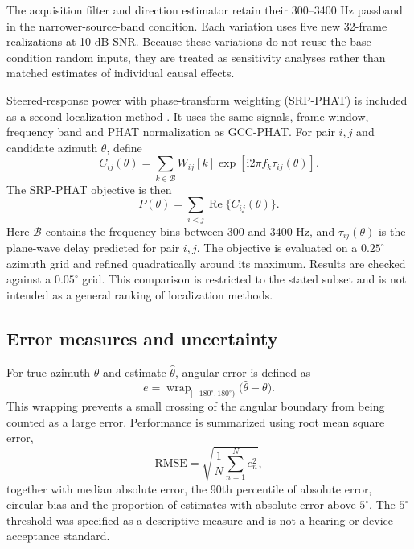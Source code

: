 \documentclass{edpsci}
\begin{document}
The acquisition filter and direction estimator retain their 300--3400 Hz passband in the narrower-source-band condition. Each variation uses five new 32-frame realizations at 10 dB SNR. Because these variations do not reuse the base-condition random inputs, they are treated as sensitivity analyses rather than matched estimates of individual causal effects.

Steered-response power with phase-transform weighting (SRP-PHAT) is included as a second localization method \citep{dibiase}. It uses the same signals, frame window, frequency band and PHAT normalization as GCC-PHAT. For pair $i,j$ and candidate azimuth $\theta$, define
\begin{equation}
	C_{ij}(\theta)
	=
	\sum_{k\in\mathcal{B}} W_{ij}[k]
	\exp\!\left[
	\mathrm{i}2\pi f_k\tau_{ij}(\theta)
	\right].
\end{equation}
The SRP-PHAT objective is then
\begin{equation}
	P(\theta)
	=
	\sum_{i<j}\operatorname{Re}
	\bigl\{C_{ij}(\theta)\bigr\}.
\end{equation}
Here $\mathcal{B}$ contains the frequency bins between 300 and 3400 Hz, and $\tau_{ij}(\theta)$ is the plane-wave delay predicted for pair $i,j$. The objective is evaluated on a $0.25^\circ$ azimuth grid and refined quadratically around its maximum. Results are checked against a $0.05^\circ$ grid. This comparison is restricted to the stated subset and is not intended as a general ranking of localization methods.

\subsection{Error measures and uncertainty}

For true azimuth $\theta$ and estimate $\widehat{\theta}$, angular error is defined as
\begin{equation}
	e=
	\operatorname{wrap}_{[-180^\circ,180^\circ)}
	\bigl(\widehat{\theta}-\theta\bigr).
\end{equation}
This wrapping prevents a small crossing of the angular boundary from being counted as a large error. Performance is summarized using root mean square error,
\begin{equation}
	\mathrm{RMSE}
	=
	\sqrt{
		\frac{1}{N}
		\sum_{n=1}^{N}e_n^2
	},
\end{equation}
together with median absolute error, the 90th percentile of absolute error, circular bias and the proportion of estimates with absolute error above $5^\circ$. The $5^\circ$ threshold was specified as a descriptive measure and is not a hearing or device-acceptance standard.
\end{document}
